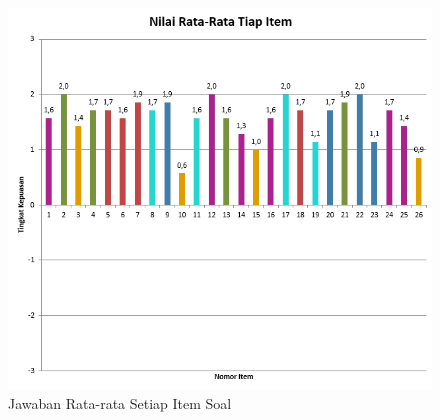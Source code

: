 \begin{figure}[!htb]
  \centering
  \includegraphics[scale=1.15]{gambar/pengujian-user-experience/rata2-tiap-jawaban.png}
  \caption{Jawaban Rata-rata Setiap Item Soal}
  \label{fig:Jawaban Rata-rata Setiap Item Soal}
\end{figure}

